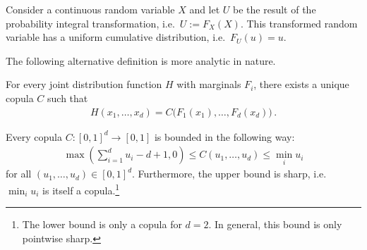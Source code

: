     \begin{property}[Uniformization]\label{prob:uniformization}
        Consider a continuous random variable $X$ and let $U$ be the result of the probability integral transformation, i.e.~$U:=F_X(X)$. This transformed random variable has a uniform cumulative distribution, i.e.~$F_U(u)=u$.
    \end{property}

    The following alternative definition is more analytic in nature.

    \begin{theorem}[Sklar]
        For every joint distribution function $H$ with marginals $F_i$, there exists a unique copula $C$ such that
        \begin{gather}
            H(x_1,\ldots,x_d) = C\bigl(F_1(x_1),\ldots,F_d(x_d)\bigr)\,.
        \end{gather}
    \end{theorem}

    \begin{property}
        Every copula $C:[0,1]^d\rightarrow[0,1]$ is bounded in the following way:
        \begin{gather}
            \max\left(\sum_{i=1}^du_i-d+1,0\right)\leq C(u_1,\ldots,u_d)\leq \min_iu_i
        \end{gather}
        for all $(u_1,\ldots,u_d)\in[0,1]^d$. Furthermore, the upper bound is sharp, i.e.~$\min_iu_i$ is itself a copula.\footnote{The lower bound is only a copula for $d=2$. In general, this bound is only pointwise sharp.}
    \end{property}

